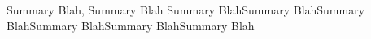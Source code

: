 

\begin{cvparagraph}

Summary Blah, Summary Blah Summary BlahSummary BlahSummary BlahSummary BlahSummary BlahSummary Blah
\end{cvparagraph}

